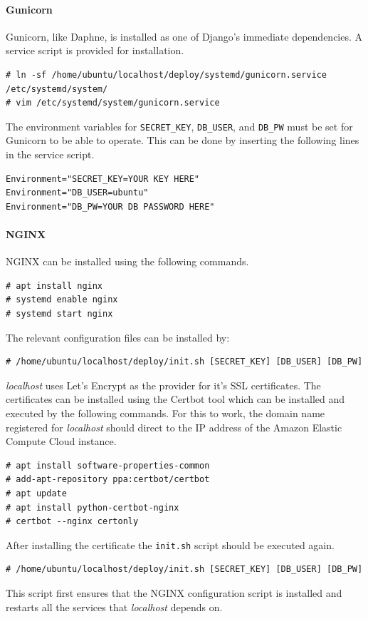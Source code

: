 \paragraph{Gunicorn}

Gunicorn, like Daphne, is installed as one of Django's immediate dependencies.
A service script is provided for installation.
\begin{lstlisting}
# ln -sf /home/ubuntu/localhost/deploy/systemd/gunicorn.service /etc/systemd/system/
# vim /etc/systemd/system/gunicorn.service
\end{lstlisting}
The environment variables for \lstinline{SECRET_KEY}, \lstinline{DB_USER},
and \lstinline{DB_PW} must be set for Gunicorn to be able to operate.
This can be done by inserting the following lines in the service script.
\begin{lstlisting}
Environment="SECRET_KEY=YOUR KEY HERE"
Environment="DB_USER=ubuntu"
Environment="DB_PW=YOUR DB PASSWORD HERE"
\end{lstlisting}

\paragraph{NGINX}

NGINX can be installed using the following commands.
\begin{lstlisting}
# apt install nginx
# systemd enable nginx
# systemd start nginx
\end{lstlisting}

The relevant configuration files can be installed by:
\begin{lstlisting}
# /home/ubuntu/localhost/deploy/init.sh [SECRET_KEY] [DB_USER] [DB_PW]
\end{lstlisting}

\emph{localhost} uses Let's Encrypt as the provider for it's SSL certificates.
The certificates can be installed using the Certbot tool which can be
installed and executed by the following commands. For this to work, the domain
name registered for \emph{localhost} should direct to the IP address of the
Amazon Elastic Compute Cloud instance.
\begin{lstlisting}
# apt install software-properties-common
# add-apt-repository ppa:certbot/certbot
# apt update
# apt install python-certbot-nginx
# certbot --nginx certonly
\end{lstlisting}

After installing the certificate the \lstinline{init.sh} script should be
executed again.
\begin{lstlisting}
# /home/ubuntu/localhost/deploy/init.sh [SECRET_KEY] [DB_USER] [DB_PW]
\end{lstlisting}
This script first ensures that the NGINX configuration script is installed
and restarts all the services that \emph{localhost} depends on.


